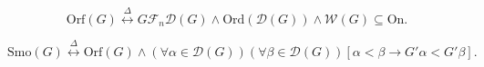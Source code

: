 $$\text{Orf}(G) \overset{\Delta}{\leftrightarrow} G \mathcal{F}_n \mathcal{D}(G) \wedge \text{Ord}(\mathcal{D}(G)) \wedge \mathcal{W}(G) \subseteq \text{On}.$$

$$\text{Smo}(G) \overset{\Delta}{\leftrightarrow} \text{Orf}(G) \wedge (\forall \alpha \in \mathcal{D}(G)) (\forall \beta \in \mathcal{D}(G)) [\alpha < \beta \rightarrow G' \alpha < G' \beta].$$
